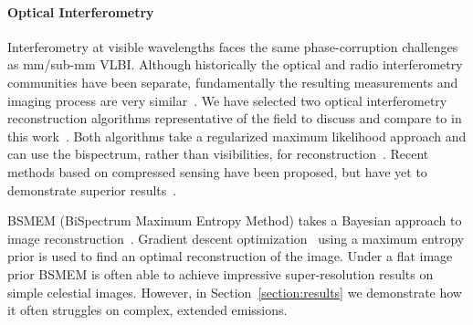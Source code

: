 {\paragraph{Optical Interferometry} 
Interferometry at visible wavelengths faces the same phase-corruption challenges as mm/sub-mm VLBI. %
Although historically the optical and radio interferometry communities have been separate, fundamentally the resulting measurements and imaging process are very similar~\cite{monnier2013radio}. 
We have selected two optical interferometry reconstruction algorithms representative of the field to discuss and compare to in this work~\cite{rusenimaging}. Both algorithms take a regularized maximum likelihood approach and can use the bispectrum, rather than visibilities, for reconstruction~\cite{baron2010novel, buscher1994direct}. Recent methods based on compressed sensing have been proposed, but have yet to demonstrate superior results~\cite{compressedsensing, rusenimaging}. 


 BSMEM (BiSpectrum Maximum Entropy Method) takes a Bayesian approach to image reconstruction~\cite{buscher1994direct}. Gradient descent optimization~\cite{skilling1990quantified} using a maximum entropy prior is used to find an optimal reconstruction of the image. 
 Under a flat image prior BSMEM is often able to achieve impressive super-resolution results on simple celestial images. However, in Section~\ref{section:results} we demonstrate how it often struggles on complex, extended emissions.


}
